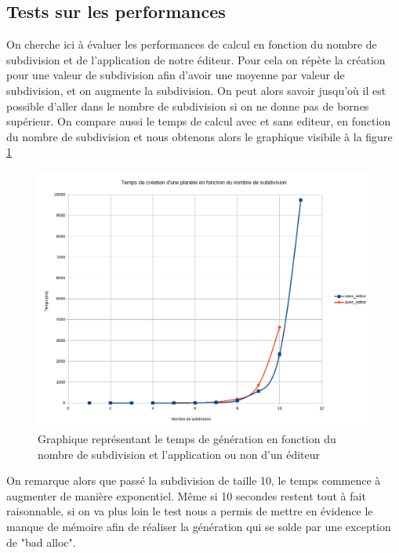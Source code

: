 \documentclass[a4paper]{article}
\begin{document}
\subsection{Tests sur les performances}

On cherche ici à évaluer les performances de calcul en fonction du nombre de subdivision et de l'application de notre éditeur. Pour cela on répète la création pour une valeur de subdivision afin d'avoir une moyenne par valeur de subdivision, et on augmente la subdivision. On peut alors savoir jusqu'où il est possible d'aller dans le nombre de subdivision si on ne donne pas de bornes supérieur. On compare aussi le temps de calcul avec et sans editeur, en fonction du nombre de subdivision et nous obtenons alors le graphique visibile à la figure \ref{graphperf}

\begin{figure}[!h]
    \begin{center}
        \includegraphics[scale=0.4]{img/perf.png}
        \caption{Graphique représentant le temps de génération en fonction du nombre de subdivision et l'application ou non d'un éditeur\protect\footnotemark}
        \label{graphperf}
    \end{center}
\end{figure}

On remarque alors que passé la subdivision de taille 10, le temps commence à augmenter de manière exponentiel. Même si 10 secondes restent tout à fait raisonnable, si on va plus loin le test nous a permis de mettre en évidence le manque de mémoire afin de réaliser la génération qui se solde par une exception de "bad alloc".
\end{document}
